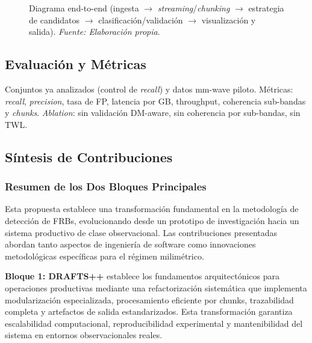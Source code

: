 \begin{figure}[H]
\caption{Diagrama end-to-end (ingesta $\to$ \emph{streaming}/\emph{chunking} $\to$ estrategia de candidatos $\to$ clasificación/validación $\to$ visualización y salida). \textit{Fuente: Elaboración propia}.}
\label{fig:pipeline-end-to-end}
\end{figure}

\subsection{Evaluación y Métricas}

Conjuntos ya analizados (control de \emph{recall}) y datos mm-wave piloto. Métricas: \emph{recall}, \emph{precision}, tasa de FP, latencia por GB, throughput, coherencia sub-bandas y \emph{chunks}. \emph{Ablation}: sin validación DM-aware, sin coherencia por sub-bandas, sin TWL.

\subsection{Síntesis de Contribuciones}

\subsubsection{Resumen de los Dos Bloques Principales}

Esta propuesta establece una transformación fundamental en la metodología de detección de FRBs, evolucionando desde un prototipo de investigación hacia un sistema productivo de clase observacional. Las contribuciones presentadas abordan tanto aspectos de ingeniería de software como innovaciones metodológicas específicas para el régimen milimétrico.

\textbf{Bloque 1: DRAFTS++} establece los fundamentos arquitectónicos para operaciones productivas mediante una refactorización sistemática que implementa modularización especializada, procesamiento eficiente por chunks, trazabilidad completa y artefactos de salida estandarizados. Esta transformación garantiza escalabilidad computacional, reproducibilidad experimental y mantenibilidad del sistema en entornos observacionales reales.

